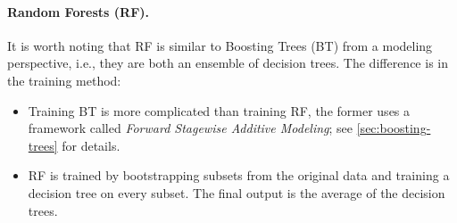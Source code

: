     \paragraph{Random Forests (RF).} It is worth noting that RF is similar to Boosting Trees (BT) from a modeling perspective, i.e., they are both an ensemble of decision trees.
    The difference is in the training method:
        \begin{itemize}
            \item Training BT is more complicated than training RF, the former uses a framework called \emph{Forward Stagewise Additive Modeling}; see \ref{sec:boosting-trees} for details.
            \item RF is trained by bootstrapping subsets from the original data and training a decision tree on every subset. 
            The final output is the average of the decision trees.
        \end{itemize}



